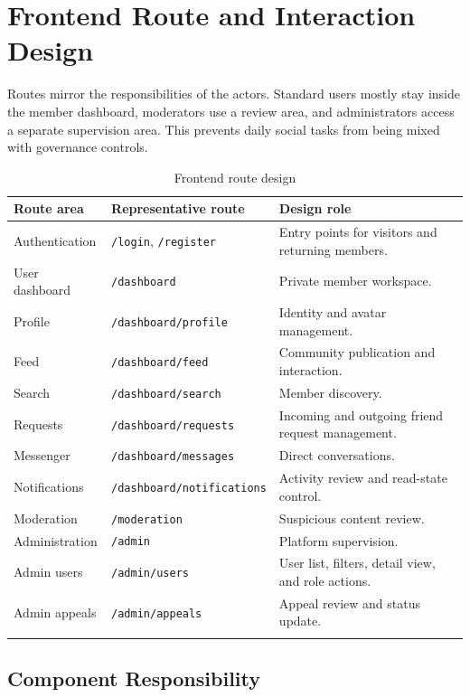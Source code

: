 \section{Frontend Route and Interaction Design}

Routes mirror the responsibilities of the actors. Standard users mostly stay inside the member dashboard, moderators use a review area, and administrators access a separate supervision area. This prevents daily social tasks from being mixed with governance controls.

\begin{longtable}{|m{3.5cm}|m{4.6cm}|m{5.6cm}|}
\hline
\textbf{Route area} & \textbf{Representative route} & \textbf{Design role} \\
\hline
Authentication & \texttt{/login}, \texttt{/register} & Entry points for visitors and returning members. \\
\hline
User dashboard & \texttt{/dashboard} & Private member workspace. \\
\hline
Profile & \texttt{/dashboard/profile} & Identity and avatar management. \\
\hline
Feed & \texttt{/dashboard/feed} & Community publication and interaction. \\
\hline
Search & \texttt{/dashboard/search} & Member discovery. \\
\hline
Requests & \texttt{/dashboard/requests} & Incoming and outgoing friend request management. \\
\hline
Messenger & \texttt{/dashboard/messages} & Direct conversations. \\
\hline
Notifications & \texttt{/dashboard/notifications} & Activity review and read-state control. \\
\hline
Moderation & \texttt{/moderation} & Suspicious content review. \\
\hline
Administration & \texttt{/admin} & Platform supervision. \\
\hline
Admin users & \texttt{/admin/users} & User list, filters, detail view, and role actions. \\
\hline
Admin appeals & \texttt{/admin/appeals} & Appeal review and status update. \\
\hline
\caption{Frontend route design}
\end{longtable}

\subsection*{Component Responsibility}

